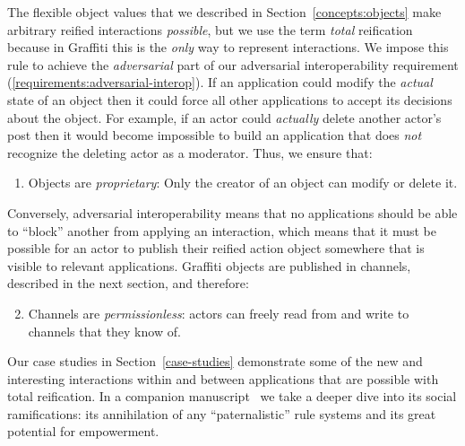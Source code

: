 The flexible object values that we described in Section~\ref{concepts:objects} make arbitrary reified interactions \emph{possible}, but we use the term \emph{total} reification because in Graffiti this is the \emph{only} way to represent interactions.
We impose this rule to achieve the \emph{adversarial} part of our adversarial interoperability requirement (\ref{requirements:adversarial-interop}).
If an application could modify the \emph{actual} state of an object then it could force all other applications to accept its decisions about the object. 
For example, if an actor could \emph{actually}
delete another actor's post then it would become impossible to build
an application that does \emph{not} recognize the deleting actor as a moderator.
Thus, we ensure that:
\begin{enumerate}
\item
Objects are \emph{proprietary}: Only the creator of an object can modify or delete it.
\end{enumerate}
Conversely, adversarial interoperability means that no applications should be able to ``block'' another from applying an interaction, which means that it must be possible for an actor to publish
their reified action object somewhere that is visible
to relevant applications.
Graffiti objects are published in channels, described in the next
section, and therefore:
\begin{enumerate}
\setcounter{enumi}{1}
\item
Channels are \emph{permissionless}: actors can freely read from and write to channels that they know of.
\end{enumerate}

Our case studies in Section~\ref{case-studies} demonstrate
some of the new and interesting interactions within and between applications
that are possible with total reification.
In a companion manuscript~\cite{companion} we take a deeper dive into its social
ramifications: its annihilation of any ``paternalistic''
rule systems and its great potential for empowerment.


